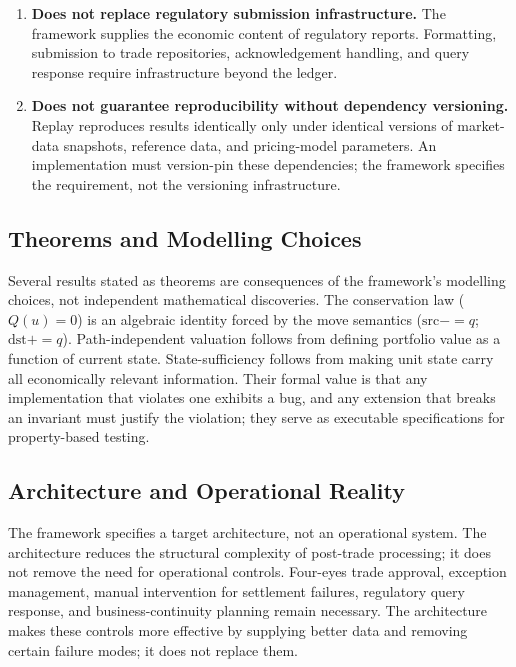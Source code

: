 \documentclass[11pt,a4paper]{article}
\begin{document}
\begin{enumerate}
\item \textbf{Does not replace regulatory submission infrastructure.} The framework supplies the economic content of regulatory reports. Formatting, submission to trade repositories, acknowledgement handling, and query response require infrastructure beyond the ledger.

\item \textbf{Does not guarantee reproducibility without dependency versioning.} Replay reproduces results identically only under identical versions of market-data snapshots, reference data, and pricing-model parameters. An implementation must version-pin these dependencies; the framework specifies the requirement, not the versioning infrastructure.
\end{enumerate}

\subsection{Theorems and Modelling Choices}

Several results stated as theorems are consequences of the framework's modelling choices, not independent mathematical discoveries. The conservation law ($Q(u)=0$) is an algebraic identity forced by the move semantics ($\mathrm{src}\mathbin{{-}{=}}q$; $\mathrm{dst}\mathbin{{+}{=}}q$). Path-independent valuation follows from defining portfolio value as a function of current state. State-sufficiency follows from making unit state carry all economically relevant information. Their formal value is that any implementation that violates one exhibits a bug, and any extension that breaks an invariant must justify the violation; they serve as executable specifications for property-based testing.

\subsection{Architecture and Operational Reality}

The framework specifies a target architecture, not an operational system. The architecture reduces the structural complexity of post-trade processing; it does not remove the need for operational controls. Four-eyes trade approval, exception management, manual intervention for settlement failures, regulatory query response, and business-continuity planning remain necessary. The architecture makes these controls more effective by supplying better data and removing certain failure modes; it does not replace them.
\end{document}

